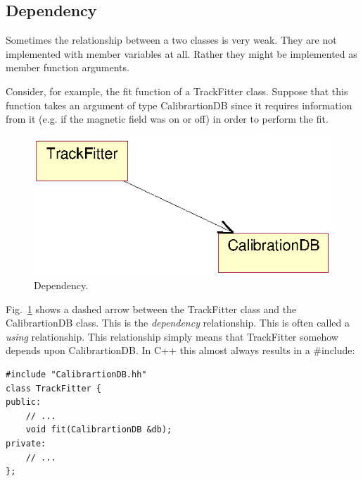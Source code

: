 \begin{enumerate}
\begin{Entry}
\begin{Entry}
{\subsection{Dependency}

Sometimes the relationship between a two classes is very weak. They
are not implemented with member variables at all. Rather they might be
implemented as member function arguments.

Consider, for example, the fit function of a TrackFitter class.
Suppose that this function takes an argument of type CalibrartionDB
since it requires information from it (e.g. if the magnetic field was
on or off) in order to perform the fit.
\begin{figure}[htb]
    \begin{center}
        \includegraphics{umlDependency.eps}
        \caption{Dependency.}
        \label{fig:umlDependency}
    \end{center}
\end{figure}
Fig.~\ref{fig:umlDependency} shows a dashed arrow between the
TrackFitter class and the CalibrartionDB class. This is the
\emph{dependency} relationship. This is often called a \emph{using}
relationship.  This relationship simply means that TrackFitter somehow
depends upon CalibrartionDB. In C++ this almost always results in a
\#include:

{\footnotesize
\begin{verbatim}
#include "CalibrartionDB.hh"
class TrackFitter {
public:
    // ...
    void fit(CalibrartionDB &db);
private:
    // ...
};
\end{verbatim}
}%

%
%

\printindex


\bye

}
\end{Entry}
\end{Entry}
\end{enumerate}
